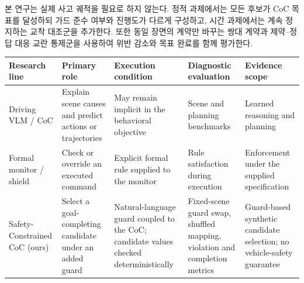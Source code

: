 본 연구는 실제 사고 궤적을 필요로 하지 않는다. 정적 과제에서는 모든 후보가 CoC 목표를 달성하되 가드 준수 여부와 진행도가 다르게 구성하고, 시간 과제에서는 계속 정지하는 교착 대조군을 추가한다. 또한 동일 장면의 계약만 바꾸는 쌍대 계약과 제약--정답 대응 교란 통제군을 사용하여 위반 감소와 목표 완료를 함께 평가한다.


\begin{table}[!t]
\color{reviewertwo}
\centering
{}
\label{tab:prior-comparison}
\scriptsize
\begin{tabularx}{\textwidth}{YYYYY}
\toprule
Research line & Primary role & Execution condition & Diagnostic evaluation & Evidence scope \\
\midrule
Driving VLM / CoC & Explain scene causes and predict actions or trajectories & May remain implicit in the behavioral objective & Scene and planning benchmarks & Learned reasoning and planning \\
Formal monitor / shield & Check or override an executed command & Explicit formal rule supplied to the monitor & Rule satisfaction during execution & Enforcement under the supplied specification \\
Safety-Constrained CoC (ours) & Select a goal-completing candidate under an added guard & Natural-language guard coupled to the CoC; candidate values checked deterministically & Fixed-scene guard swap, shuffled mapping, violation and completion metrics & Guard-based synthetic candidate selection; no vehicle-safety guarantee \\
\bottomrule
\end{tabularx}
\end{table}
